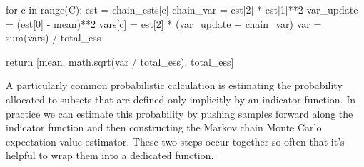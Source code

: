 \documentclass[
  letterpaper,
  DIV=11,
  numbers=noendperiod]{scrartcl}
\newenvironment{Shaded}{\begin{snugshade}}{\end{snugshade}}
\newcommand{\BuiltInTok}[1]{\textcolor[rgb]{0.00,0.23,0.31}{#1}}
\newcommand{\ControlFlowTok}[1]{\textcolor[rgb]{0.00,0.23,0.31}{#1}}
\newcommand{\DecValTok}[1]{\textcolor[rgb]{0.68,0.00,0.00}{#1}}
\newcommand{\KeywordTok}[1]{\textcolor[rgb]{0.00,0.23,0.31}{#1}}
\newcommand{\NormalTok}[1]{\textcolor[rgb]{0.00,0.23,0.31}{#1}}
\newcommand{\OperatorTok}[1]{\textcolor[rgb]{0.37,0.37,0.37}{#1}}
\begin{document}
\begin{Shaded}
\begin{Highlighting}[]
  \ControlFlowTok{for}\NormalTok{ c }\KeywordTok{in} \BuiltInTok{range}\NormalTok{(C):}
\NormalTok{    est }\OperatorTok{=}\NormalTok{ chain\_ests[c]}
\NormalTok{    chain\_var }\OperatorTok{=}\NormalTok{ est[}\DecValTok{2}\NormalTok{] }\OperatorTok{*}\NormalTok{ est[}\DecValTok{1}\NormalTok{]}\OperatorTok{**}\DecValTok{2}
\NormalTok{    var\_update }\OperatorTok{=}\NormalTok{ (est[}\DecValTok{0}\NormalTok{] }\OperatorTok{{-}}\NormalTok{ mean)}\OperatorTok{**}\DecValTok{2}
    \BuiltInTok{vars}\NormalTok{[c] }\OperatorTok{=}\NormalTok{ est[}\DecValTok{2}\NormalTok{] }\OperatorTok{*}\NormalTok{ (var\_update }\OperatorTok{+}\NormalTok{ chain\_var)}
\NormalTok{  var }\OperatorTok{=} \BuiltInTok{sum}\NormalTok{(}\BuiltInTok{vars}\NormalTok{) }\OperatorTok{/}\NormalTok{ total\_ess}

  \ControlFlowTok{return}\NormalTok{ [mean, math.sqrt(var }\OperatorTok{/}\NormalTok{ total\_ess), total\_ess]}
\end{Highlighting}
\end{Shaded}

A particularly common probabilistic calculation is estimating the
probability allocated to subsets that are defined only implicitly by an
indicator function. In practice we can estimate this probability by
pushing samples forward along the indicator function and then
constructing the Markov chain Monte Carlo expectation value estimator.
These two steps occur together so often that it's helpful to wrap them
into a dedicated function.
\end{document}
